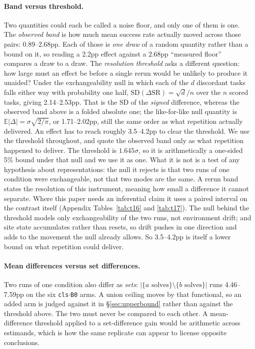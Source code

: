  \paragraph{Band versus threshold.} Two quantities could each be called a noise floor, and only one of them is one. The \emph{observed band} is how much mean success rate actually moved across those pairs: 0.89--2.68pp. Each of those is \emph{one draw} of a random quantity rather than a bound on it, so reading a 2.2pp effect against a 2.68pp ``measured floor'' compares a draw to a draw. The \emph{resolution threshold} asks a different question: how large must an effect be before a single rerun would be unlikely to produce it unaided? Under the exchangeability null in which each of the $d$ discordant tasks falls either way with probability one half, $\mathrm{SD}(\Delta\mathrm{SR}) = \sqrt{d}/n$ over the $n$ scored tasks, giving 2.14--2.53pp. That is the SD of the \emph{signed} difference, whereas the observed band above is a folded absolute one; the like-for-like null quantity is $\mathbb{E}|\Delta| = \sigma\sqrt{2/\pi}$, or 1.71--2.02pp, still the same order as what repetition actually delivered. An effect has to reach roughly 3.5--4.2pp to clear the threshold. We use the threshold throughout, and quote the observed band only as what repetition happened to deliver. The threshold is $1.645\sigma$, so it is arithmetically a one-sided 5\% bound under that null and we use it as one. What it is not is a test of any hypothesis about representations: the null it rejects is that two runs of one condition were exchangeable, not that two modes are the same. A rerun band states the resolution of this instrument, meaning how small a difference it cannot separate. Where this paper needs an inferential claim it uses a paired interval on the contrast itself (Appendix Tables~\ref{tab:t16} and \ref{tab:t17}). The null behind the threshold models only exchangeability of the two runs, not environment drift; and site state accumulates rather than resets, so drift pushes in one direction and adds to the movement the null already allows. So 3.5--4.2pp is itself a lower bound on what repetition could deliver.

\paragraph{Mean differences versus set differences.} Two runs of one condition also differ as \emph{sets}: $|\{a\text{ solves}\} \setminus \{b\text{ solves}\}|$ runs 4.46--7.59pp on the six \texttt{cls$\cdot$B0} arms. A union ceiling moves by that functional, so an added arm is judged against it in \S\ref{sec:upperbound} rather than against the threshold above. The two must never be compared to each other. A mean-difference threshold applied to a set-difference gain would be arithmetic across estimands, which is how the same replicate can appear to license opposite conclusions.

